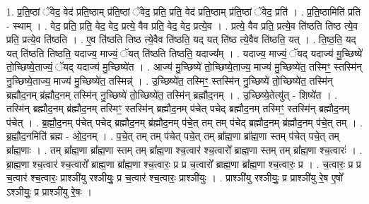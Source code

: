 \documentclass[17pt]{extarticle}
\begin{document}
1. प्र॒ति॒ष्ठां ॅवेद॒ वेद॑ प्रति॒ष्ठाम् प्र॑ति॒ष्ठां ॅवेद॒ प्रति॒ प्रति॒ वेद॑ प्रति॒ष्ठाम् प्र॑ति॒ष्ठां ॅवेद॒ प्रति॑ । . प्र॒ति॒ष्ठामिति॑ प्रति - स्थाम् । . वेद॒ प्रति॒ प्रति॒ वेद॒ वेद॒ प्रत्ये॒ वैव प्रति॒ वेद॒ वेद॒ प्रत्ये॒व । . प्रत्ये॒ वैव प्रति॒ प्रत्ये॒व ति॑ष्ठति तिष्ठ त्ये॒व प्रति॒ प्रत्ये॒व ति॑ष्ठति । . ए॒व ति॑ष्ठति तिष्ठ त्ये॒वैव ति॑ष्ठति॒ यद् यत् ति॑ष्ठ त्ये॒वैव ति॑ष्ठति॒ यत् । . ति॒ष्ठ॒ति॒ यद् यत् ति॑ष्ठति तिष्ठति॒ यदाज्य॒ माज्यं॒ ॅयत् ति॑ष्ठति तिष्ठति॒ यदाज्य᳚म् । . यदाज्य॒ माज्यं॒ ॅयद् यदाज्य॑ मु॒च्छिष्ये॑ तो॒च्छिष्ये॒ताज्यं॒ ॅयद् यदाज्य॑ मु॒च्छिष्ये॑त । . आज्य॑ मु॒च्छिष्ये॑ तो॒च्छिष्ये॒ताज्य॒ माज्य॑ मु॒च्छिष्ये॑त॒ तस्मिꣳ॒॒ स्तस्मि॑न् नु॒च्छिष्ये॒ताज्य॒ माज्य॑ मु॒च्छिष्ये॑त॒ तस्मिन्न्॑ । . उ॒च्छिष्ये॑त॒ तस्मिꣳ॒॒ स्तस्मि॑न् नु॒च्छिष्ये॑ तो॒च्छिष्ये॑त॒ तस्मि॑न् ब्रह्मौद॒नम् ब्र॑ह्मौद॒नम् तस्मि॑न् नु॒च्छिष्ये॑ तो॒च्छिष्ये॑त॒ तस्मि॑न् ब्रह्मौद॒नम् । . उ॒च्छिष्ये॒तेत्यु॑त् - शिष्ये॑त । . तस्मि॑न् ब्रह्मौद॒नम् ब्र॑ह्मौद॒नम् तस्मिꣳ॒॒ स्तस्मि॑न् ब्रह्मौद॒नम् प॑चेत् पचेद् ब्रह्मौद॒नम् तस्मिꣳ॒॒ स्तस्मि॑न् ब्रह्मौद॒नम् प॑चेत् । . ब्र॒ह्मौ॒द॒नम् प॑चेत् पचेद् ब्रह्मौद॒नम् ब्र॑ह्मौद॒नम् प॑चे॒त् तम् तम् प॑चेद् ब्रह्मौद॒नम् ब्र॑ह्मौद॒नम् प॑चे॒त् तम् । . ब्र॒ह्मौ॒द॒नमिति॑ ब्रह्म - ओ॒द॒नम् । . प॒चे॒त् तम् तम् प॑चेत् पचे॒त् तम् ब्रा᳚ह्म॒णा ब्रा᳚ह्म॒णा स्तम् प॑चेत् पचे॒त् तम् ब्रा᳚ह्म॒णाः । . तम् ब्रा᳚ह्म॒णा ब्रा᳚ह्म॒णा स्तम् तम् ब्रा᳚ह्म॒णा श्च॒त्वार॑ श्च॒त्वारो᳚ ब्राह्म॒णा स्तम् तम् ब्रा᳚ह्म॒णा श्च॒त्वारः॑ । . ब्रा॒ह्म॒णा श्च॒त्वार॑ श्च॒त्वारो᳚ ब्राह्म॒णा ब्रा᳚ह्म॒णा श्च॒त्वारः॒ प्र प्र च॒त्वारो᳚ ब्राह्म॒णा ब्रा᳚ह्म॒णा श्च॒त्वारः॒ प्र । . च॒त्वारः॒ प्र प्र च॒त्वार॑ श्च॒त्वारः॒ प्राश्ञी॑यु रश्ञीयुः॒ प्र च॒त्वार॑ श्च॒त्वारः॒ प्राश्ञी॑युः । . प्राश्ञी॑यु रश्ञीयुः॒ प्र प्राश्ञी॑यु रे॒ष ए॒षो᳚ ऽश्ञीयुः॒ प्र प्राश्ञी॑यु रे॒षः । \newline
\end{document}
